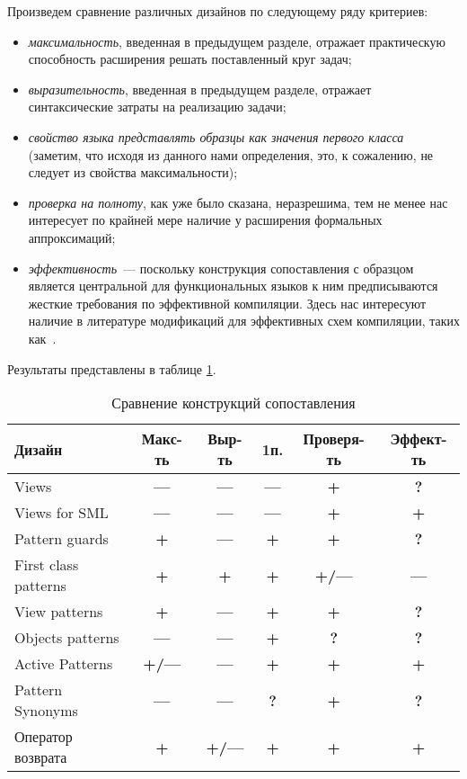 Произведем сравнение различных дизайнов по следующему ряду критериев:
\begin{itemize}
\item \textit{максимальность}, введенная в предыдущем разделе, отражает практическую способность расширения решать поставленный круг \mbox{задач};
\item \textit{выразительность}, введенная в предыдущем разделе, отражает синтаксические затраты на реализацию задачи;
\item \textit{свойство языка представлять образцы как значения первого \mbox{класса}} (заметим, что исходя из данного нами определения, это, к сожалению, не следует из свойства максимальности);
\item \textit{проверка на полноту}, как уже было сказана, неразрешима, тем не менее нас интересует по крайней мере наличие у расширения формальных аппроксимаций;
\item \textit{эффективность}~--- поскольку конструкция сопоставления с образцом является центральной для функциональных языков к ним предписываются жесткие требования по эффективной компиляции. Здесь нас интересуют наличие в литературе модификаций для эффективных схем компиляции, таких как~\cite{fessant2001optimizing, maranget2008decisiontrees, scott2000whendo}.
\end{itemize}

Результаты представлены в таблице \ref{tab:comparison}.

\begin{table}[H]
\centering
\begin{tabular}{l|c|c|c|c|c}
Дизайн               & Макс-ть        & Выр-ть     & 1п.          & Проверя-ть      & Эффект-ть      \\ \hline
Views                & \textbf{---}   & \textbf{---} & \textbf{---} & \textbf{+}      & \textbf{?}     \\
Views for SML        & \textbf{---}   & \textbf{---} & \textbf{---} & \textbf{+}      & \textbf{+}     \\
Pattern guards       & \textbf{+}     & \textbf{---} & \textbf{+}   & \textbf{+}      & \textbf{?}     \\
First class patterns & \textbf{+}     & \textbf{+}   & \textbf{+}   & \textbf{+/---}     & \textbf{---}  \\
View patterns        & \textbf{+}     & \textbf{---} & \textbf{+}   & \textbf{+}      & \textbf{?}     \\
Objects patterns     & \textbf{---}   & \textbf{---} & \textbf{+}   & \textbf{?}     & \textbf{?}     \\
Active Patterns      & \textbf{+/---}  & \textbf{---} & \textbf{+}   & \textbf{+}      & \textbf{+}     \\
Pattern Synonyms     & \textbf{---}   & \textbf{---} & \textbf{?}   & \textbf{+}      & \textbf{?}     \\
Оператор возврата    & \textbf{+}     & \textbf{+/---} & \textbf{+}  & \textbf{+}      & \textbf{+}     \\
\end{tabular}
\caption{\label{tab:comparison} Сравнение конструкций сопоставления}
\end{table}

